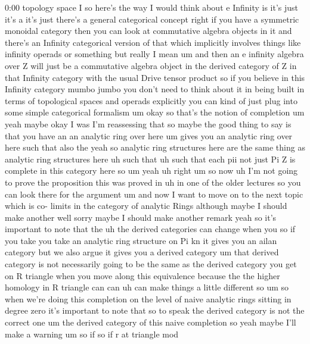 \begin{unfinished}{0:00}
topology
space  I  so  here's  the  way  I  would  think
about  e  Infinity  is  it's  just  it's  a
it's  just  there's  a  general  categorical
concept  right  if  you  have  a  symmetric
monoidal  category  then  you  can  look  at
commutative  algebra  objects  in  it  and
there's  an  Infinity  categorical  version
of
that  which  implicitly  involves  things
like  infinity  operads  or  something  but
really  I  mean  um  and  then  an  e  infinity
algebra  over  Z  will  just  be  a
commutative  algebra  object  in  the
derived  category  of  Z  in  that  Infinity
category  with  the  usual  Drive  tensor
product
so  if  you  believe  in  this  Infinity
category  mumbo  jumbo  you  don't  need  to
think  about  it  in  being  built  in  terms
of  topological  spaces  and  operads
explicitly  you  can  kind  of  just  plug
into  some  simple  categorical
formalism
um
okay
so  that's  the  notion  of
completion
um  yeah  maybe  okay  I  was  I'm  reassessing
that  so  maybe  the  good  thing  to  say  is
that  you  have  an  an  analytic  ring  over
here  um  gives  you  an  analytic  ring  over
here  such  that  also  the  yeah  so  analytic
ring  structures  here  are  the  same  thing
as  analytic  ring  structures  here  uh  such
that  uh  such  that  each  pii  not  just  Pi  Z
is  complete  in  this  category  here
so
um
yeah  uh
right  um  so
now  uh  I'm  not  going  to  prove  the
proposition  this  was  proved  in  uh  in  one
of  the  older  lectures
so  you  can  look  there  for  the
argument
um  and  now  I  want  to  move  on  to  the  next
topic  which  is  co-  limits  in  the
category  of  analytic  Rings  although
maybe  I  should  make  another  well  sorry
maybe  I  should  make  another  remark  yeah
so  it's  important  to  note  that  the  uh
the  derived  categories  can  change  when
you  so  if  you  take  you  take  an  analytic
ring  structure  on  Pi  kn
it  gives  you  an  ailan  category  but  we
also  argue  it  gives  you  a  derived
category  um  that  derived  category  is  not
necessarily  going  to  be  the  same  as  the
derived  category  you  get  on  R  triangle
when  you  move  along  this  equivalence
because  the  the  higher  homology  in  R
triangle  can  can  uh  can  make  things  a
little  different  so  um  so  when  we're
doing  this  completion  on  the  level  of
naive  analytic  rings  sitting  in  degree
zero  it's  important  to  note  that  so  to
speak  the  derived  category  is  not  the
correct  one
um  the  derived  category  of  this  naive
completion  so  yeah  maybe  I'll  make  a
warning  um  so  if  so  if  r  at  triangle  mod

\end{unfinished}
